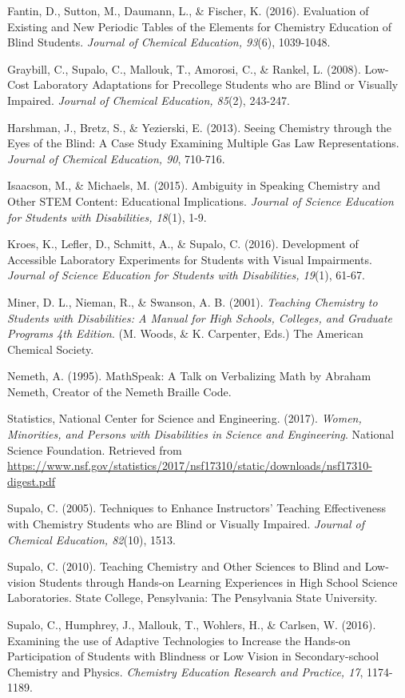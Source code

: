 \documentclass[11.5pt]{sig-alternate} %
\begin{document}
Fantin, D., Sutton, M., Daumann, L., \& Fischer, K. (2016). Evaluation of Existing and New Periodic Tables of the Elements for Chemistry Education of Blind Students. \textit{Journal of Chemical Education, 93}(6), 1039-1048.

Graybill, C., Supalo, C., Mallouk, T., Amorosi, C., \& Rankel, L. (2008). Low-Cost Laboratory Adaptations for Precollege Students who are Blind or Visually Impaired. \textit{Journal of Chemical Education, 85}(2), 243-247.

Harshman, J., Bretz, S., \& Yezierski, E. (2013). Seeing Chemistry through the Eyes of the Blind: A Case Study Examining Multiple Gas Law Representations. \textit{Journal of Chemical Education, 90}, 710-716.

Isaacson, M., \& Michaels, M. (2015). Ambiguity in Speaking Chemistry and Other STEM Content: Educational Implications. \textit{Journal of Science Education for Students with Disabilities, 18}(1), 1-9.

Kroes, K., Lefler, D., Schmitt, A., \& Supalo, C. (2016). Development of Accessible Laboratory Experiments for Students with Visual Impairments. \textit{Journal of Science Education for Students with Disabilities, 19}(1), 61-67.

Miner, D. L., Nieman, R., \& Swanson, A. B. (2001). \textit{Teaching Chemistry to Students with Disabilities: A Manual for High Schools, Colleges, and Graduate Programs 4th Edition}. (M. Woods, \& K. Carpenter, Eds.) The American Chemical Society.

Nemeth, A. (1995). MathSpeak: A Talk on Verbalizing Math by Abraham Nemeth, Creator of the Nemeth Braille Code.

Statistics, National Center for Science and Engineering. (2017). \textit{Women, Minorities, and Persons with Disabilities in Science and Engineering}. National Science Foundation. Retrieved from \url{https://www.nsf.gov/statistics/2017/nsf17310/static/downloads/nsf17310-digest.pdf}

Supalo, C. (2005). Techniques to Enhance Instructors' Teaching Effectiveness with Chemistry Students who are Blind or Visually Impaired. \textit{Journal of Chemical Education, 82}(10), 1513.

Supalo, C. (2010). Teaching Chemistry and Other Sciences to Blind and Low-vision Students through Hands-on Learning Experiences in High School Science Laboratories. State College, Pensylvania: The Pensylvania State University.

Supalo, C., Humphrey, J., Mallouk, T., Wohlers, H., \& Carlsen, W. (2016). Examining the use of Adaptive Technologies to Increase the Hands-on Participation of Students with Blindness or Low Vision in Secondary-school Chemistry and Physics. \textit{Chemistry Education Research and Practice, 17}, 1174-1189.
\end{document}
